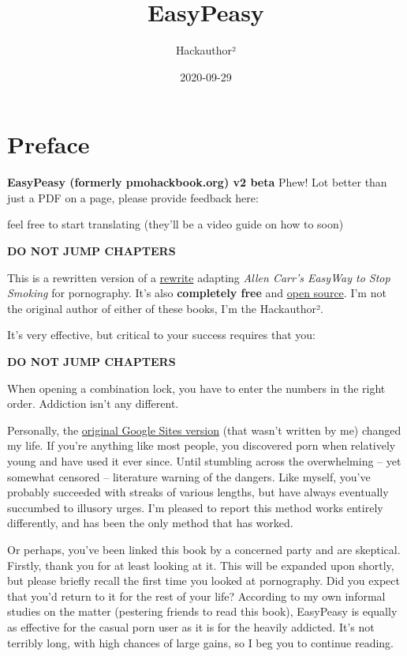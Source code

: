 \documentclass[
]{book}
\title{EasyPeasy}
\author{Hackauthor²}
\date{2020-09-29}
\begin{document}
\maketitle

{
\setcounter{tocdepth}{1}
\tableofcontents
}
\hypertarget{preface}{%
\chapter*{Preface}\label{preface}}

\textbf{EasyPeasy (formerly pmohackbook.org) v2 beta} Phew! Lot better than just a PDF on a page, please provide feedback here:

feel free to start translating (they'll be a video guide on how to soon)

{\textbf{DO NOT JUMP CHAPTERS}}

This is a rewritten version of a \href{https://sites.google.com/site/hackbookeasypeasy}{rewrite} adapting \emph{Allen Carr's EasyWay to Stop Smoking} for pornography. It's also \textbf{completely free} and \href{https://gitlab.com/snuggy/easypeasy}{open source}. I'm not the original author of either of these books, I'm the Hackauthor².

It's very effective, but critical to your success requires that you:

{\textbf{DO NOT JUMP CHAPTERS}}

When opening a combination lock, you have to enter the numbers in the right order. Addiction isn't any different.

Personally, the \href{https://sites.google.com/site/hackbookeasypeasy}{original Google Sites version} (that wasn't written by me) changed my life. If you're anything like most people, you discovered porn when relatively young and have used it ever since. Until stumbling across the overwhelming -- yet somewhat censored -- literature warning of the dangers. Like myself, you've probably succeeded with streaks of various lengths, but have always eventually succumbed to illusory urges. I'm pleased to report this method works entirely differently, and has been the only method that has worked.

Or perhaps, you've been linked this book by a concerned party and are skeptical. Firstly, thank you for at least looking at it. This will be expanded upon shortly, but please briefly recall the first time you looked at pornography. Did you expect that you'd return to it for the rest of your life? According to my own informal studies on the matter (pestering friends to read this book), EasyPeasy is equally as effective for the casual porn user as it is for the heavily addicted. It's not terribly long, with high chances of large gains, so I beg you to continue reading.
\end{document}
